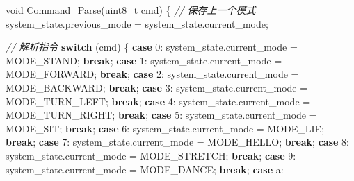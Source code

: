 \documentclass[
]{article}
\newenvironment{Shaded}{}{}
\newcommand{\CharTok}[1]{\textcolor[rgb]{0.25,0.44,0.63}{#1}}
\newcommand{\CommentTok}[1]{\textcolor[rgb]{0.38,0.63,0.69}{\textit{#1}}}
\newcommand{\ControlFlowTok}[1]{\textcolor[rgb]{0.00,0.44,0.13}{\textbf{#1}}}
\newcommand{\DataTypeTok}[1]{\textcolor[rgb]{0.56,0.13,0.00}{#1}}
\newcommand{\NormalTok}[1]{#1}
\begin{document}
\begin{Shaded}
\begin{Highlighting}[]
\DataTypeTok{void}\NormalTok{ Command\_Parse(}\DataTypeTok{uint8\_t}\NormalTok{ cmd)}
\NormalTok{\{}
    \CommentTok{// 保存上一个模式}
\NormalTok{    system\_state.previous\_mode = system\_state.current\_mode;}
    
    \CommentTok{// 解析指令}
    \ControlFlowTok{switch}\NormalTok{ (cmd) \{}
        \ControlFlowTok{case} \CharTok{\textquotesingle{}0\textquotesingle{}}\NormalTok{:}
\NormalTok{            system\_state.current\_mode = MODE\_STAND;}
            \ControlFlowTok{break}\NormalTok{;}
        \ControlFlowTok{case} \CharTok{\textquotesingle{}1\textquotesingle{}}\NormalTok{:}
\NormalTok{            system\_state.current\_mode = MODE\_FORWARD;}
            \ControlFlowTok{break}\NormalTok{;}
        \ControlFlowTok{case} \CharTok{\textquotesingle{}2\textquotesingle{}}\NormalTok{:}
\NormalTok{            system\_state.current\_mode = MODE\_BACKWARD;}
            \ControlFlowTok{break}\NormalTok{;}
        \ControlFlowTok{case} \CharTok{\textquotesingle{}3\textquotesingle{}}\NormalTok{:}
\NormalTok{            system\_state.current\_mode = MODE\_TURN\_LEFT;}
            \ControlFlowTok{break}\NormalTok{;}
        \ControlFlowTok{case} \CharTok{\textquotesingle{}4\textquotesingle{}}\NormalTok{:}
\NormalTok{            system\_state.current\_mode = MODE\_TURN\_RIGHT;}
            \ControlFlowTok{break}\NormalTok{;}
        \ControlFlowTok{case} \CharTok{\textquotesingle{}5\textquotesingle{}}\NormalTok{:}
\NormalTok{            system\_state.current\_mode = MODE\_SIT;}
            \ControlFlowTok{break}\NormalTok{;}
        \ControlFlowTok{case} \CharTok{\textquotesingle{}6\textquotesingle{}}\NormalTok{:}
\NormalTok{            system\_state.current\_mode = MODE\_LIE;}
            \ControlFlowTok{break}\NormalTok{;}
        \ControlFlowTok{case} \CharTok{\textquotesingle{}7\textquotesingle{}}\NormalTok{:}
\NormalTok{            system\_state.current\_mode = MODE\_HELLO;}
            \ControlFlowTok{break}\NormalTok{;}
        \ControlFlowTok{case} \CharTok{\textquotesingle{}8\textquotesingle{}}\NormalTok{:}
\NormalTok{            system\_state.current\_mode = MODE\_STRETCH;}
            \ControlFlowTok{break}\NormalTok{;}
        \ControlFlowTok{case} \CharTok{\textquotesingle{}9\textquotesingle{}}\NormalTok{:}
\NormalTok{            system\_state.current\_mode = MODE\_DANCE;}
            \ControlFlowTok{break}\NormalTok{;}
        \ControlFlowTok{case} \CharTok{\textquotesingle{}a\textquotesingle{}}\NormalTok{:}

\end{Highlighting}
\end{Shaded}
\end{document}
